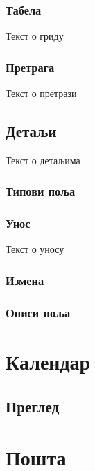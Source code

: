 \documentclass[a4paper,10pt,english]{report}
\begin{document}
\subsubsection{Табела}
\label{\detokenize{prirucnik/evidencija:id6}}
Текст о гриду


\subsubsection{Претрага}
\label{\detokenize{prirucnik/evidencija:id7}}
Текст о претрази


\subsection{Детаљи}
\label{\detokenize{prirucnik/evidencija:id8}}
Текст о детаљима


\subsubsection{Типови поља}
\label{\detokenize{prirucnik/evidencija:id9}}

\subsubsection{Унос}
\label{\detokenize{prirucnik/evidencija:id10}}
Текст о уносу


\subsubsection{Измена}
\label{\detokenize{prirucnik/evidencija:id11}}

\subsubsection{Описи поља}
\label{\detokenize{prirucnik/evidencija:id12}}

\section{Календар}
\label{\detokenize{prirucnik/kalendar:kalendar}}\label{\detokenize{prirucnik/kalendar:id1}}\label{\detokenize{prirucnik/kalendar::doc}}

\subsection{Преглед}
\label{\detokenize{prirucnik/kalendar:id2}}

\section{Пошта}
\label{\detokenize{prirucnik/posta:posta}}\label{\detokenize{prirucnik/posta:id1}}\label{\detokenize{prirucnik/posta::doc}}
\end{document}
